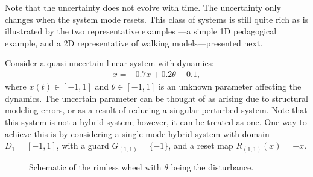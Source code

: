 Note that the uncertainty does not evolve with time.
The uncertainty only changes when the system mode resets. 
This class of systems is still quite rich as is illustrated by the two representative examples ---a simple 1D pedagogical example, and a 2D representative of walking models---presented next.
\begin{example}
\label{example:1D}
Consider a quasi-uncertain linear system with dynamics:
\begin{align}
	\dot x = -0.7x+0.2\theta-0.1,
\end{align}
where \mbox{$x(t)\in [-1,1]$} and $\theta\in [-1,1]$ is an unknown parameter affecting the dynamics. 
The uncertain parameter can be thought of as arising due to structural modeling errors, or as a result of reducing a singular-perturbed system. 
Note that this system is not a hybrid system; however, it can be treated as one.
One way to achieve this is by considering a single mode hybrid system with domain $D_1 = [-1,1]$, with a guard $ G_{(1,1)} = \{-1\}$, and a reset map $R_{(1,1)}(x) = -x$.
\end{example}
\begin{figure}[!t]
\centering
  \caption{Schematic of the rimless wheel with $\theta$ being the disturbance.}
  \label{fig:rw_schematic}
\end{figure}

